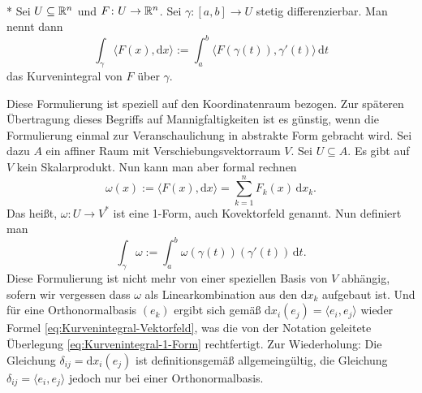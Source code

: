 \begin{definition}\mbox{}\\*
Sei $U\subseteq\mathbb R^n$ und $F\colon U\to\mathbb R^n$.
Sei $\gamma\colon [a,b]\to U$ stetig differenzierbar. Man nennt dann
\begin{equation}\label{eq:Kurvenintegral-Vektorfeld}
\int_\gamma\langle F(x),\mathrm dx\rangle
:= \int_a^b \langle F(\gamma(t)),\gamma'(t)\rangle\,\mathrm dt
\end{equation}
das Kurvenintegral von $F$ über $\gamma$.
\end{definition}
Diese Formulierung ist speziell auf den Koordinatenraum bezogen. Zur
späteren Übertragung dieses Begriffs auf Mannigfaltigkeiten ist
es günstig, wenn die Formulierung einmal zur Veranschaulichung in
abstrakte Form gebracht wird. Sei dazu $A$ ein affiner Raum mit
Verschiebungsvektorraum $V$. Sei $U\subseteq A$. Es gibt auf
$V$ kein Skalarprodukt. Nun kann man aber formal rechnen%
\begin{equation}\label{eq:Kurvenintegral-1-Form}
\omega(x) := \langle F(x),\mathrm dx\rangle = \sum_{k=1}^n F_k(x)\,\mathrm dx_k.
\end{equation}
Das heißt, $\omega\colon U\to V^*$ ist eine 1-Form, auch Kovektorfeld
genannt. Nun definiert man%
\begin{equation}
\int_\gamma \omega
:= \int_a^b \omega(\gamma(t))(\gamma'(t))\,\mathrm dt.
\end{equation}
Diese Formulierung ist nicht mehr von einer speziellen Basis von $V$
abhängig, sofern wir vergessen dass $\omega$ als Linearkombination
aus den $\mathrm dx_k$ aufgebaut ist. Und für eine Orthonormalbasis
$(e_k)$ ergibt sich gemäß $\mathrm dx_i(e_j) = \langle e_i,e_j\rangle$
wieder Formel \eqref{eq:Kurvenintegral-Vektorfeld}, was die von der
Notation geleitete Überlegung \eqref{eq:Kurvenintegral-1-Form}
rechtfertigt. Zur Wiederholung: Die Gleichung
$\delta_{ij}=\mathrm dx_i(e_j)$ ist definitionsgemäß allgemeingültig,
die Gleichung $\delta_{ij}=\langle e_i,e_j\rangle$
jedoch nur bei einer Orthonormalbasis.

